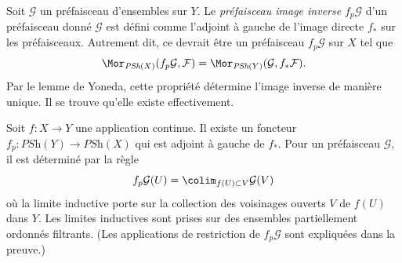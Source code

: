 \noindent
Soit $\mathcal{G}$ un préfaisceau d'ensembles sur $Y$.
Le {\it préfaisceau image inverse} $f_p\mathcal{G}$
d'un préfaisceau donné $\mathcal{G}$ est défini comme l'adjoint à gauche
de l'image directe $f_*$ sur les préfaisceaux. Autrement dit, ce
devrait être un préfaisceau $f_p \mathcal{G}$ sur $X$ tel que
$$
\Mor_{\textit{PSh}(X)}(f_p\mathcal{G}, \mathcal{F})
=
\Mor_{\textit{PSh}(Y)}(\mathcal{G}, f_*\mathcal{F}).
$$
Par le lemme de Yoneda, cette propriété détermine l'image inverse de manière unique.
Il se trouve qu'elle existe effectivement.

\begin{lemma}
\label{lemma-pullback-presheaves}
Soit $f : X \to Y$ une application continue.
Il existe un foncteur
$f_p : \textit{PSh}(Y) \to \textit{PSh}(X)$
qui est adjoint à gauche de $f_*$. Pour un préfaisceau
$\mathcal{G}$, il est déterminé par la règle
$$
f_p\mathcal{G}(U) = \colim_{f(U) \subset V} \mathcal{G}(V)
$$
où la limite inductive porte sur la collection des voisinages ouverts
$V$ de $f(U)$ dans $Y$. Les limites inductives sont prises sur des
ensembles partiellement ordonnés filtrants.
(Les applications de restriction de $f_p\mathcal{G}$ sont expliquées dans la preuve.)
\end{lemma}

